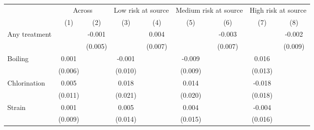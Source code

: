 {
\def\sym#1{\ifmmode^{#1}\else\(^{#1}\)\fi}
\begin{tabular}{l*{8}{c}}
\hline\hline
                    &\multicolumn{2}{c}{Across}                 &\multicolumn{2}{c}{Low risk at source}     &\multicolumn{2}{c}{Medium risk at source}  &\multicolumn{2}{c}{High risk at source}    \\\cmidrule(lr){2-3}\cmidrule(lr){4-5}\cmidrule(lr){6-7}\cmidrule(lr){8-9}
                    &\multicolumn{1}{c}{(1)}         &\multicolumn{1}{c}{(2)}         &\multicolumn{1}{c}{(3)}         &\multicolumn{1}{c}{(4)}         &\multicolumn{1}{c}{(5)}         &\multicolumn{1}{c}{(6)}         &\multicolumn{1}{c}{(7)}         &\multicolumn{1}{c}{(8)}         \\
\hline
Any treatment &                     &      -0.001         &                     &       0.004         &                     &      -0.003         &                     &      -0.002         \\
                    &                     &     (0.005)         &                     &     (0.007)         &                     &     (0.007)         &                     &     (0.009)         \\
Boiling             &       0.001         &                     &      -0.001         &                     &      -0.009         &                     &       0.016         &                     \\
                    &     (0.006)         &                     &     (0.010)         &                     &     (0.009)         &                     &     (0.013)         &                     \\
Chlorination        &       0.005         &                     &       0.018         &                     &       0.014         &                     &      -0.018         &                     \\
                    &     (0.011)         &                     &     (0.021)         &                     &     (0.020)         &                     &     (0.018)         &                     \\
Strain              &       0.001         &                     &       0.005         &                     &       0.004         &                     &      -0.004         &                     \\
                    &     (0.009)         &                     &     (0.014)         &                     &     (0.015)         &                     &     (0.016)         &                     \\

\end{tabular}}
